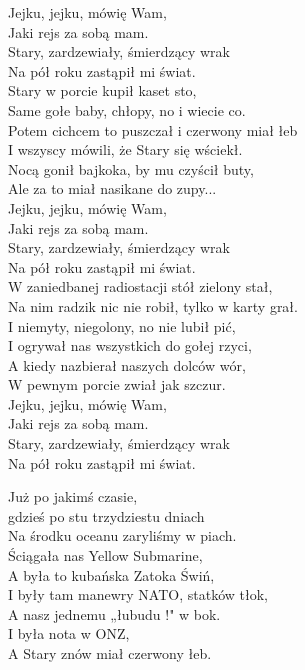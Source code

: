 Jejku, jejku, mówię Wam, \\
Jaki rejs za sobą mam. \\
Stary, zardzewiały, śmierdzący wrak \\
Na pół roku zastąpił mi świat. \\

Stary w porcie kupił kaset sto, \\
Same gołe baby, chłopy, no i wiecie co. \\
Potem cichcem to puszczał i czerwony miał łeb \\
I wszyscy mówili, że Stary się wściekł. \\
Nocą gonił bajkoka, by mu czyścił buty, \\
Ale za to miał nasikane do zupy... \\

Jejku, jejku, mówię Wam, \\
Jaki rejs za sobą mam. \\
Stary, zardzewiały, śmierdzący wrak \\
Na pół roku zastąpił mi świat. \\

W zaniedbanej radiostacji stół zielony stał, \\
Na nim radzik nic nie robił, tylko w karty grał. \\
I niemyty, niegolony, no nie lubił pić, \\
I ogrywał nas wszystkich do gołej rzyci, \\
A kiedy nazbierał naszych dolców wór, \\
W pewnym porcie zwiał jak szczur. \\

Jejku, jejku, mówię Wam, \\
Jaki rejs za sobą mam. \\
Stary, zardzewiały, śmierdzący wrak \\
Na pół roku zastąpił mi świat. \\
\newpage

Już po jakimś czasie, \\
gdzieś po stu trzydziestu dniach \\
Na środku oceanu zaryliśmy w piach. \\
Ściągała nas Yellow Submarine, \\
A była to kubańska Zatoka Świń, \\
I były tam manewry NATO, statków tłok, \\
A nasz jednemu „łubudu !" w bok. \\
I była nota w ONZ, \\
A Stary znów miał czerwony łeb. \\

